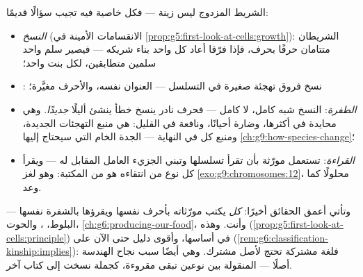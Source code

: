 \begin{proposition}\label{prop:g9:genes-and-dna:explains}
الشريط المزدوج ليس زينة --- فكل خاصية فيه تجيب سؤالًا
قديمًا:
\begin{itemize}
  \item \emph{النسخ} (الانقسامات الأمينة في
        \cref{prop:g5:first-look-at-cells:growth}):
        الشريطان متتامان حرفًا بحرف، فإذا فرّقا أعاد كل
        واحد بناء شريكه --- فيصير سلم واحد سلمين
        متطابقين، لكل  بنت واحد؛
  \item \emph{}: نسخ  فروق تهجئة صغيرة
        في التسلسل --- العنوان نفسه، والأحرف مغيَّرة؛
  \item \emph{الطفرة}: النسخ شبه كامل، لا
        كامل --- فحرف نادر ينسخ خطأ ينشئ أليلًا
        \emph{جديدًا}. وهي محايدة في أكثرها، وضارة
        أحيانًا، ونافعة في القليل:  هي منبع
        التهجئات الجديدة، ومنبع كل  في النهاية
        --- الجدة الخام التي سيحتاج إليها
        \cref{ch:g9:how-species-change}؛
  \item \emph{القراءة}: تستعمل  مورّثة بأن تقرأ
        تسلسلها وتبني الجزيء العامل المقابل له --- ويقرأ
        كل نوع من  انتقاءه هو من المكتبة: وهو لغز
        \cref{exo:g9:chromosomes:12}، محلولًا كما وعد.
\end{itemize}
\end{proposition}
\admitted

\begin{remark}\label{rem:g9:genes-and-dna:universal}
وتأتي أعمق الحقائق أخيرًا: \emph{كل}  يكتب
مورّثاته بأحرف  نفسها ويقرؤها بالشفرة نفسها ---
البلوط، ، والحوت، 
\cref{ch:g6:producing-our-food}، وأنت. وهذه 
(\cref{prop:g5:first-look-at-cells:principle}) في
أساسها، وأقوى دليل حتى الآن على 
(\cref{rem:g6:classification-kinship:implies}): فلغة
مشتركة تحتج لأصل مشترك. وهي أيضًا سبب نجاح الهندسة
 أصلًا ---  المنقولة بين نوعين تبقى
مقروءة، كجملة نسخت إلى كتاب آخر.
\end{remark}

